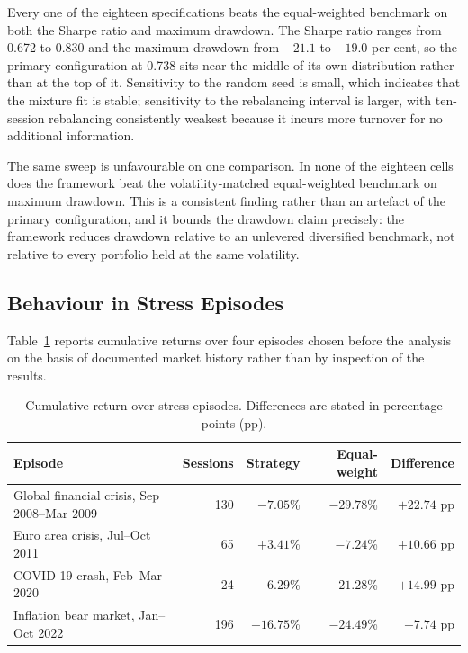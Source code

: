 \documentclass{singlecol-new}
\theoremstyle{TH}{
\newtheorem{lemma}{Lemma}
\newtheorem{theorem}[lemma]{Theorem}
\newtheorem{corrolary}[lemma]{Corrolary}
\newtheorem{conjecture}[lemma]{Conjecture}
\newtheorem{proposition}[lemma]{Proposition}
\newtheorem{claim}[lemma]{Claim}
\newtheorem{stheorem}[lemma]{Wrong Theorem}
\newtheorem{algorithm}{Algorithm}
}
\theoremstyle{THrm}{
\newtheorem{definition}{Definition}[section]
\newtheorem{question}{Question}[section]
\newtheorem{remark}{Remark}
\newtheorem{scheme}{Scheme}
}
\theoremstyle{THhit}{
\newtheorem{case}{Case}[section]
}
\begin{document}
Every one of the eighteen specifications beats the equal-weighted benchmark on both the
Sharpe ratio and maximum drawdown. The Sharpe ratio ranges from 0.672 to 0.830 and the
maximum drawdown from $-21.1$ to $-19.0$ per cent, so the primary configuration at
0.738 sits near the middle of its own distribution rather than at the top of it.
Sensitivity to the random seed is small, which indicates that the mixture fit is stable;
sensitivity to the rebalancing interval is larger, with ten-session rebalancing
consistently weakest because it incurs more turnover for no additional information.

The same sweep is unfavourable on one comparison. In none of the eighteen cells does
the framework beat the volatility-matched equal-weighted benchmark on maximum drawdown.
This is a consistent finding rather than an artefact of the primary configuration, and
it bounds the drawdown claim precisely: the framework reduces drawdown relative to an
unlevered diversified benchmark, not relative to every portfolio held at the same
volatility.

\subsection{Behaviour in Stress Episodes}

Table~\ref{tab:episodes} reports cumulative returns over four episodes chosen before the analysis on the
basis of documented market history rather than by inspection of the results.

\begin{table}[!ht]
\centering
\caption{Cumulative return over stress episodes. Differences are stated in percentage
points (pp).}
\label{tab:episodes}
\small
\begin{tabular}{p{3.6cm}rrrr}
\hline
\textbf{Episode} & \textbf{Sessions} & \textbf{Strategy} & \textbf{Equal-weight} & \textbf{Difference} \\
\hline
Global financial crisis, Sep 2008--Mar 2009 & 130 & $-7.05$\% & $-29.78$\% & $+22.74$ pp \\
Euro area crisis, Jul--Oct 2011 & 65 & $+3.41$\% & $-7.24$\% & $+10.66$ pp \\
COVID-19 crash, Feb--Mar 2020 & 24 & $-6.29$\% & $-21.28$\% & $+14.99$ pp \\
Inflation bear market, Jan--Oct 2022 & 196 & $-16.75$\% & $-24.49$\% & $+7.74$ pp \\
\hline
\end{tabular}
\end{table}
\end{document}
